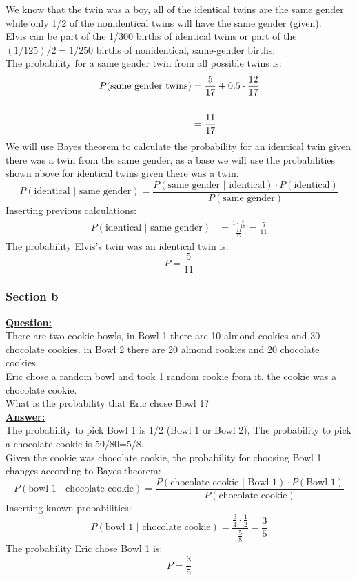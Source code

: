 \documentclass[a4, 12pt,titlepage]{scrartcl}
\begin{document}
We know that the twin was a boy, all of the identical twins are the same gender while only 1/2 of the nonidentical twins will have the same gender (given).\\
Elvis can be part of the 1/300 births of identical twins or part of the $(1/125)/2=1/250$ births of nonidentical, same-gender births.\\
The probability for a same gender twin from all possible twins is:
\begin{align*}
P(\textrm{same gender twins})&=\frac{5}{17}+0.5\cdot \frac{12}{17}\\\smallskip\\
&=\frac{11}{17}
\end{align*}
We will use Bayes theorem to calculate the probability for an identical twin given there was a twin from the same gender, as a base we will use the probabilities shown above for identical twins given there was a twin.\[
P(\textrm{identical $|$ same gender})=\frac{P(\textrm{same gender $|$ identical})\cdot P(\textrm{identical})}{P(\textrm{same gender})}
\]Inserting previous calculations:
\begin{align*}
P(\textrm{identical $|$ same gender})&=\frac{1\cdot \frac{5}{17}}{\frac{11}{17}}=\frac{5}{11}
\end{align*}
The probability Elvis's twin was an identical twin is:
\[
\boxed{P=\frac{5}{11}}
\]
\newpage
\subsubsection{Section b}
\textbf{\underline{Question:}}\\
There are two cookie bowls, in Bowl 1 there are 10 almond cookies and 30 chocolate cookies. in Bowl 2 there are 20 almond cookies and 20 chocolate cookies.\\
Eric chose a random bowl and took 1 random cookie from it. the cookie was a chocolate cookie.\\
What is the probability that Eric chose Bowl 1?\\
\textbf{\underline{Answer:}}\\
The probability to pick Bowl 1 is 1/2 (Bowl 1 or Bowl 2),
The probability to pick a chocolate cookie is 50/80=5/8.\\
Given the cookie was chocolate cookie, the probability for choosing Bowl 1 changes according to Bayes theorem:\\
\[
P(\textrm{bowl 1 $|$ chocolate cookie})=\frac{P(\textrm{chocolate cookie $|$ Bowl 1})\cdot P(\textrm{Bowl 1})}{P(\textrm{chocolate cookie})}
\]
Inserting known probabilities:
\[
P(\textrm{bowl 1 $|$ chocolate cookie})=\frac{\frac{3}{4}\cdot \frac{1}{2}}{\frac{5}{8}}=\frac{3}{5}
\]
The probability Eric chose Bowl 1 is:
\[
\boxed{P=\frac{3}{5}}
\]
\newpage
\end{document}
